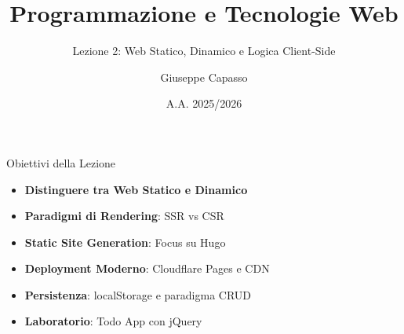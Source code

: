 \documentclass[10pt]{beamer}
\title[Web Statico vs Dinamico]{Programmazione e Tecnologie Web}
\subtitle{Lezione 2: Web Statico, Dinamico e Logica Client-Side}
\author{Giuseppe Capasso}
\institute[ITS]{Istituto Tecnico Superiore (ITS)}
\date{A.A. 2025/2026}
\begin{document}
\begin{frame}
    \titlepage
\end{frame}

\begin{frame}{Obiettivi della Lezione}
    \begin{itemize}
        \item \textbf{Distinguere tra Web Statico e Dinamico}
        \item \textbf{Paradigmi di Rendering}: SSR vs CSR
        \item \textbf{Static Site Generation}: Focus su Hugo
        \item \textbf{Deployment Moderno}: Cloudflare Pages e CDN
        \item \textbf{Persistenza}: localStorage e paradigma CRUD
        \item \textbf{Laboratorio}: Todo App con jQuery
    \end{itemize}
\end{frame}

\end{document}
